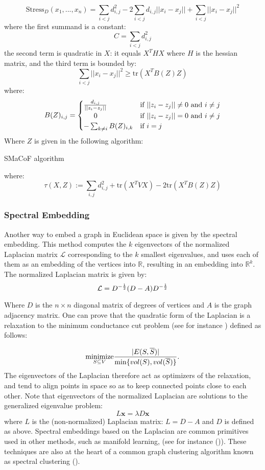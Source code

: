\[
  \text{Stress}_D(x_1, ... , x_n) = \sum_{i < j} d_{i,j}^2 - 2\sum_{i<j} d_{i,j}||x_i - x_j|| + \sum_{i<j} ||x_i - x_j||^2
\]
where the first summand is a constant:
\[
    C = \sum_{i < j} d_{i,j}^2
\]
the second term is quadratic in $X$: it equals $X^THX$ where $H$ is the hessian matrix, and the third term is bounded by:
\[
    \sum_{i<j} ||x_i - x_j||^2 \geq \text{tr}(X^TB(Z)Z)
\]
where:
\[
    B(Z)_{i,j} = \begin{cases} {d_{i,j}\over||z_i - z_j||} &\text{if }||z_i - z_j||\neq 0 \text{ and }i\neq j\\
    \hspace{5mm}0 &\text{if } ||z_i - z_j|| = 0\text{ and }i \neq j\\
    -\sum_{k \neq i}B(Z)_{i,k} &\text{if } i=j\end{cases}
\]
Where $Z$ is given in the following algorithm:

\begin{algorithm}[H]
\SetAlgoLined
{}
\caption{SMaCoF algorithm}
\end{algorithm}

where:
\[
  \tau(X,Z) := \sum_{i,j}d_{i,j}^2 + \text{tr}(X^T V X) - 2 \text{tr}(X^TB(Z)Z)
\]

\subsubsection{Spectral Embedding}
Another way to embed a graph in Euclidean space is given by the spectral embedding. This method computes the $k$ eigenvectors of the normalized Laplacian matrix $\mathcal{L}$  corresponding to the $k$ smallest eigenvalues, and uses each of them as an embedding of the  vertices into $\mathbb{R}$, resulting in an  embedding into $\mathbb{R}^k$. The normalized Laplacian matrix is given by:
\[
    \mathcal{L} = D^{-{1\over 2}}(D - A)D^{-{1\over 2}}
\]

Where $D$ is the $n \times n$ diagonal matrix of degrees of vertices and $A$ is the graph adjacency matrix. One can prove that the quadratic form of the Laplacian is a relaxation to the minimum conductance cut problem (see for instance \cite{chung1997spectral}) defined as follows:

\[
    \underset{S  \subseteq V }{\text{minimize}} {|E(S,\overline{S})|\over \min\{vol(S), vol(\overline{S})\}}.
\]
The eigenvectors of the Laplacian therefore act as optimizers of the relaxation, and tend to align points in space so as to keep connected points close to each other. Note that eigenvectors of the normalized Laplacian are solutions to the generalized eigenvalue problem:
\[
    L\mathbf{x} = \lambda D\mathbf{x}
\]
where $L$ is the (non-normalized) Laplacian matrix: $L = D-A$ and $D$ is defined as above. Spectral embeddings based on the Laplacian are common primitives used in other methods, such as manifold learning, (see for instance (\cite{belkin2003laplacian})). These techniques are also at the heart of a common graph clustering algorithm known as spectral clustering (\cite{ng2002spectral}).
